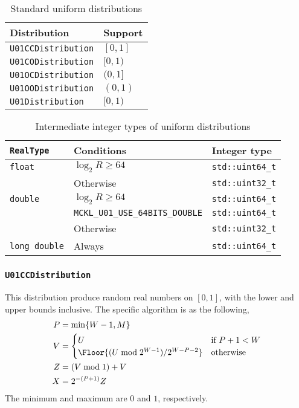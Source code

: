 \begin{table}
  \begin{tabularx}{\textwidth}{LL}
    \toprule
    Distribution & Support \\
    \midrule
    \verb|U01CCDistribution| & $[0, 1]$ \\
    \verb|U01CODistribution| & $[0, 1)$ \\
    \verb|U01OCDistribution| & $(0, 1]$ \\
    \verb|U01OODistribution| & $(0, 1)$ \\
    \verb|U01Distribution|   & $[0, 1)$ \\
    \bottomrule
  \end{tabularx}
  \caption{Standard uniform distributions}
  \label{tab:Standard uniform distributions}
\end{table}

\begin{table}
  \begin{tabularx}{\textwidth}{LlL}
    \toprule
    \verb|RealType| & Conditions & Integer type \\
    \midrule
    \verb|float| & $\log_2 R \ge 64$ & \verb|std::uint64_t| \\
                 & Otherwise         & \verb|std::uint32_t| \\
    \verb|double| & $\log_2 R \ge 64$ & \verb|std::uint64_t| \\
    & \verb|MCKL_U01_USE_64BITS_DOUBLE| & \verb|std::uint64_t| \\
    & Otherwise & \verb|std::uint32_t| \\
    \verb|long double| & Always & \verb|std::uint64_t| \\
    \bottomrule
  \end{tabularx}
  \caption{Intermediate integer types of uniform distributions}
  \label{tab:Intermediate integer types of uniform distributions}
\end{table}

\subsubsection{\texttt{U01CCDistribution}}

This distribution produce random real numbers on $[0, 1]$, with the lower and
upper bounds inclusive. The specific algorithm is as the following,
\begin{align*}
  P &= \min\{W - 1, M\} \\
  V &= \begin{cases}
    U &\text{if } P + 1 < W \\
    \Floor{(U \bmod 2^{W - 1}) / 2^{W - P -2}} &\text{otherwise}
  \end{cases} \\
  Z &= (V \bmod 1) + V \\
  X &= 2^{-(P + 1)} Z
\end{align*}
The minimum and maximum are $0$ and $1$, respectively.

